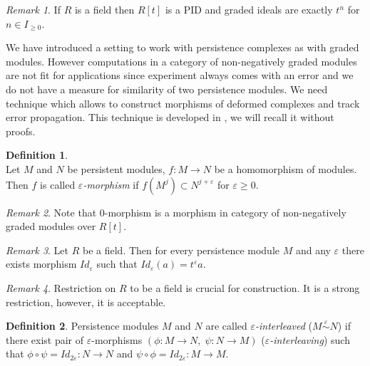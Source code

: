 \documentclass[a4paper, 12pt]{article}
\theoremstyle{definition}
\newtheorem{definition}{Definition}
\theoremstyle{remark}
\newtheorem{remark}{Remark}
\newcommand{\define}[1]{{\textit{#1}}}
\renewcommand{\geq}{\geqslant}
\begin{document}
\begin{remark}
  If $R$ is a field then $R[t]$ is a PID and graded ideals are exactly $t^n$ for $n \in I_{\geq 0}$.
\end{remark}


We have introduced a setting to work with persistence complexes as with graded modules. However computations in a category of non-negatively graded modules are not fit for applications since experiment always comes with an error and we do not have a measure for similarity of two persistence modules. We need technique which allows to construct morphisms of deformed complexes and track error propagation. This technique is developed in {\cite{GS16}}, we will recall it without proofs.

\begin{definition} {\cite[Definition 2.7]{GS16}}\\
  Let $M$ and $N$ be persistent modules, $f : M \to N$ be a homomorphism of modules. Then $f$ is called \define{$\varepsilon$-morphism} if $f(M^j) \subset N^{j+\varepsilon}$ for $\varepsilon \geq 0$.
\end{definition}

\begin{remark}
  Note that $0$-morphism is a morphism in category of non-negatively graded modules over $R[t]$.
\end{remark}

\begin{remark}
  Let $R$ be a field. Then for every persistence module $M$ and any $\varepsilon$ there exists morphism $Id_{\varepsilon}$ such that $Id_{\varepsilon}(a) = t^{\varepsilon}a$.
\end{remark}

\begin{remark}
  Restriction on $R$ to be a field is crucial for construction. It is a strong restriction, however, it is acceptable.
\end{remark}

\begin{definition}
  Persistence modules $M$ and $N$ are called \define{$\varepsilon$-interleaved} ($M \stackrel{\varepsilon}{\sim} N$) if there exist pair of $\varepsilon$-morphisms $(\phi : M \to N,\;\psi : N \to M)$ (\define{$\varepsilon$-interleaving}) such that $\phi \circ \psi = Id_{2\varepsilon} : N \to N$ and $\psi \circ \phi = Id_{2\varepsilon} : M \to M$.
\end{definition}
\end{document}
